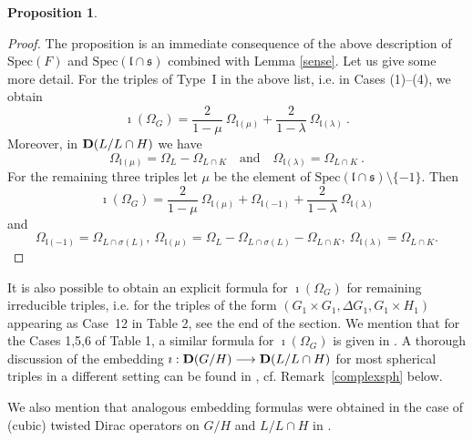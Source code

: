 \documentclass[10]{amsart}
\newtheorem{pro}[thm]{Proposition}
\theoremstyle{remark}
\theoremstyle{definition}
\numberwithin{equation}{section}
\newcommand{\fl}{{\mathfrak l}}
\newcommand{\fs}{{\mathfrak s}}
\begin{document}
{\begin{pro}
\begin{itemize}
\end{equation*}
\end{itemize}
\end{pro}
%
\begin{proof}
The proposition is an immediate consequence of the above description of $\text{Spec}(F)$ and $\text{Spec}(\fl\cap\fs)$ combined with Lemma \ref{sense}. Let us give some
more detail. For the triples of Type~I in the above list, i.e. in Cases (1)--(4), we obtain
$$ \imath(\Omega_G)=\frac{2}{1-\mu}\: \Omega_{\fl(\mu)}+\frac{2}{1-\lambda}\: \Omega_{\fl(\lambda)}\ .$$
Moreover, in ${\bf D}(L/L\cap H)$ we have
$$   \Omega_{\fl(\mu)}=\Omega_L-\Omega_{L\cap K}\quad\mbox{and}\quad \Omega_{\fl(\lambda)}=\Omega_{L\cap K}\ .$$
For the remaining three triples let $\mu$ be the element of $\text{Spec}(\fl\cap\fs)\setminus \{-1\}$. Then 
$$ \imath(\Omega_G)=\frac{2}{1-\mu}\: \Omega_{\fl(\mu)}+\Omega_{\fl(-1)}+\frac{2}{1-\lambda}\: \Omega_{\fl(\lambda)}$$
and
$$ \Omega_{\fl(-1)}=\Omega_{L\cap\sigma(L)},\  \Omega_{\fl(\mu)}=\Omega_L-\Omega_{L\cap\sigma(L)} -\Omega_{L\cap K},\ \Omega_{\fl(\lambda)}=\Omega_{L\cap K}.$$
\end{proof}

%

It is also possible to obtain an explicit formula for $\imath(\Omega_G)$ for remaining irreducible triples, i.e. for the triples of the form $(G_1\times G_1,\Delta G_1,G_1\times H_1)$ appearing as Case~12 in Table 2, see the end of the section. We  mention that for the Cases 1,5,6  of Table 1, a similar formula for $\imath(\Omega_G)$ is given in \cite{STV18}. A thorough discussion of the embedding $\imath:{\bf D}(G/H)\longrightarrow {\bf D}(L/L\cap H)$ for most
spherical triples in a different setting can be found in \cite{KK19}, cf. Remark~\ref{complexsph} below. 

We also mention that analogous embedding formulas were obtained in the case of (cubic) twisted Dirac operators on $G/H$ and $L/L\cap H$ in \cite{MP21}.

}
\end{document}
